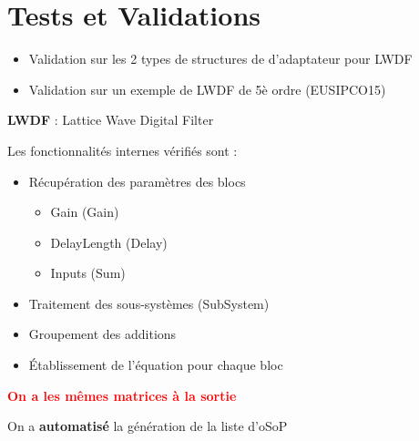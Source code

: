 \section{Tests et Validations}
\hspace*{2cm}
\frame{\tableofcontents[currentsection]}
\begin{frame} 
	\begin{itemize}
	\item Validation sur les 2 types de structures de d'adaptateur pour LWDF
	\begin{center}
	\end{center}
	\item Validation sur un exemple de LWDF de 5è ordre (EUSIPCO15)
	\begin{center}
	\end{center}
	\end{itemize}
	\textbf{LWDF} : Lattice Wave Digital Filter
\end{frame}

\begin{frame} 
Les fonctionnalités internes vérifiés sont : 
\begin{itemize}
\item Récupération des paramètres des blocs
	\begin{itemize}
	\item Gain (Gain)
	\item DelayLength (Delay)
	\item Inputs (Sum)
	\end{itemize}
\item Traitement des sous-systèmes (SubSystem)
\item Groupement des additions 
\item Établissement de l'équation pour chaque bloc
\end{itemize}
\bigskip
\hspace{2cm}\textbf{\textcolor{red}{On a les mêmes matrices à la sortie}}  \\
\end{frame}


\begin{frame} 
	On a \textbf{automatisé} la génération de la liste d'oSoP
	\begin{center}
	\end{center}
\end{frame}

